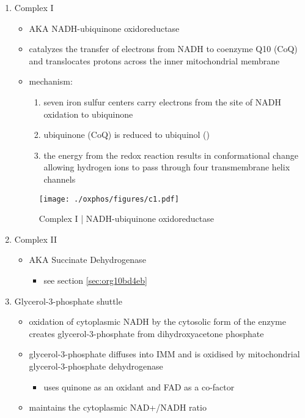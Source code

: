 \documentclass{scrartcl}
\begin{document}
\begin{enumerate}
\item Complex I
\label{sec:org3be7a4d}
\begin{itemize}
\item AKA NADH-ubiquinone oxidoreductase
\item catalyzes the transfer of electrons from NADH to coenzyme Q10
(CoQ) and translocates protons across the inner mitochondrial
membrane
\end{itemize}

{\small{}}

\begin{itemize}
\item mechanism: 
\begin{enumerate}
\item seven iron sulfur centers carry electrons from the site of NADH
oxidation to ubiquinone

\item ubiquinone (CoQ) is reduced to ubiquinol ()

\item the energy from the redox reaction results in conformational
change allowing hydrogen ions to pass through four transmembrane
helix channels
\end{enumerate}
\end{itemize}

\begin{figure}[htbp]
\centering
\texttt{[image: ./oxphos/figures/c1.pdf]}
\caption[c1]{\label{fig:org55ac8aa}
Complex I | NADH-ubiquinone oxidoreductase}
\end{figure}

\item Complex II
\label{sec:org29f35d6}
\begin{itemize}
\item AKA Succinate Dehydrogenase 
\begin{itemize}
\item see section \ref{sec:org10bd4eb}
\end{itemize}
\end{itemize}

\item Glycerol-3-phosphate shuttle
\label{sec:org6bfade7}
\begin{itemize}
\item oxidation of cytoplasmic NADH by the cytosolic form of the enzyme
creates glycerol-3-phosphate from dihydroxyacetone phosphate
\item glycerol-3-phosphate diffuses into IMM and is oxidised by mitochondrial glycerol-3-phosphate dehydrogenase
\begin{itemize}
\item uses quinone as an oxidant and FAD as a co-factor
\end{itemize}
\item maintains the cytoplasmic NAD+/NADH ratio
\end{itemize}


\end{enumerate}
\end{document}
